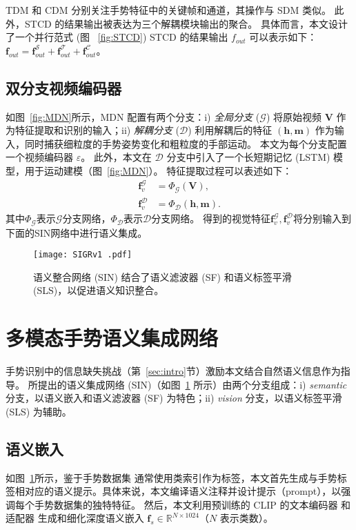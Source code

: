 TDM 和 CDM 分别关注手势特征中的关键帧和通道，其操作与 SDM 类似。
此外，STCD 的结果输出被表达为三个解耦模块输出的聚合。
具体而言，本文设计了一个并行范式 (图 ~\ref{fig:STCD})
STCD 的结果输出 ${f}_{out}$ 可以表示如下：$\mathbf{f}_{out} = \mathbf{f}_{out}^{\mathcal{S}} + \mathbf{f}_{out}^{\mathcal{T}} + \mathbf{f}_{out}^{\mathcal{C}}$。

\subsection{双分支视频编码器}
\label{sec:DBVE}
如图~\ref{fig:MDN}所示，MDN 配置有两个分支：i) \emph{全局分支} ($\mathcal{G}$) 将原始视频 $\mathbf{V}$ 作为特征提取和识别的输入；ii) \emph{解耦分支} ($\mathcal{D}$) 利用解耦后的特征 $\mathbf{(h, m)}$ 作为输入，同时捕获细粒度的手势姿势变化和粗粒度的手部运动。
本文为每个分支配置一个视频编码器 $\varepsilon$。
此外，本文在 $\mathcal{D}$ 分支中引入了一个长短期记忆 (LSTM) 模型，用于运动建模（图~\ref{fig:MDN}）。
特征提取过程可以表述如下：
\begin{equation}
\label{eq:fv}
\begin{aligned}
  \mathbf{f}_{v}^{\mathcal{G}} &= \Phi_{\mathcal{G}}(\mathbf{V}), \\
  \mathbf{f}_{v}^{\mathcal{D}} &= \Phi_{\mathcal{D}}(\mathbf{h}, \mathbf{m}).
\end{aligned}
\end{equation}
其中$\Phi_{\mathcal{G}}$表示$\mathcal{G}$分支网络，$\Phi_{\mathcal{D}}$表示$\mathcal{D}$分支网络。
得到的视觉特征$\mathbf{f}_{v}^{\mathcal{G}}, \mathbf{f}_{v}^{\mathcal{D}}$将分别输入到下面的SIN网络中进行语义集成。

\begin{figure}[tb]
\centering
\texttt{[image: SIGRv1 .pdf]}
\caption{语义整合网络 (SIN) 结合了语义滤波器 (SF) 和语义标签平滑 (SLS)，以促进语义知识整合。 }
\label{fig:SIN}
\end{figure}
\section{多模态手势语义集成网络}
\label{sec:SIN}
手势识别中的信息缺失挑战（第~\ref{sec:intro}节）激励本文结合自然语义信息作为指导。
所提出的语义集成网络 (SIN)（如图~\ref{fig:SIN} 所示）由两个分支组成：i) \emph{semantic} 分支，以语义嵌入和语义滤波器 (SF) 为特色；ii) \emph{vision} 分支，以语义标签平滑 (SLS) 为辅助。

\subsection{语义嵌入}
如图~\ref{fig:SIN}所示，鉴于手势数据集 \cite{wan2020chalearn,tang2017action,molchanov2016online} 通常使用类索引作为标签，本文首先生成与手势标签相对应的语义提示。具体来说，本文编译语义注释并设计提示（prompt），以强调每个手势数据集的独特特征。
然后，本文利用预训练的 CLIP 的文本编码器 \cite{radford2021learning} 和适配器 \cite{gao2024clip} 生成和细化深度语义嵌入 $\mathbf{f}_{s}\in \mathbb{R}^{N\times 1024}$（$N$ 表示类数）。%


